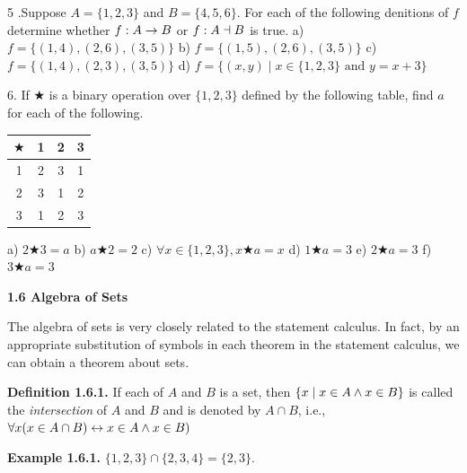 \begin{large}
5 .Suppose $A=\{1,2,3\}$ and $B=\{4,5,6\}$. For each of the following denitions of $f$ determine whether $f :A \to B$ or $f :A \dashv B$ is true.  \nl
a) $f= \{(1,4), (2,6), (3,5)\}$\nl
b) $f=\{ (1,5), (2,6), (3,5)\}$ \nl
c) $f =\{(1,4), (2,3), (3,5)\}$\nl
d) $f= \{(x,y) \mid x \in \{1,2, 3\} \text{~and~} y = x + 3\}$ \nl

6. If $\bigstar$ is a binary operation over $\{1,2,3\}$ defined by the following table, find $a$ for each of the following. \nl





\begin{tabular}{| c | c | c | c |}
\hline
$\bigstar$ & 1 & 2 & 3\\ \hline
1 & 2 & 3 & 1 \\ \hline
2 & 3 & 1 & 2 \\ \hline
3 & 1 & 2 & 3 \\ \hline
\end{tabular} \nl

a) $2\bigstar 3 = a$\nl
b) $a\bigstar 2 = 2$\nl
c) $\forall x \in  \{1,2,3\}, x\bigstar a = x $\nl
d) $1\bigstar a = 3 $\nl
e) $2\bigstar a = 3 $\nl
f) $3\bigstar a = 3 $\nl

\newpage
\textbf{1.6 Algebra of Sets}\nl

The algebra of sets is very closely related to the statement calculus. In fact, by an appropriate substitution of symbols in each theorem in the statement calculus, we can obtain a theorem about sets. \nl

\textbf{Definition 1.6.1.} If each of $A$ and $B$ is a set, then $\{x \mid  x \in A \wedge x \in B\}$ is called the \textit{intersection} of $A$ and $B$ and is denoted by $A \cap B$, i.e., $\forall x (x \in A \cap B) \leftrightarrow x \in A \wedge x \in B)$ \nl

\textbf{Example 1.6.1.} $\{1, 2, 3\} \cap \{2, 3, 4\} =\{2, 3\}$. \nl


\end{large}
